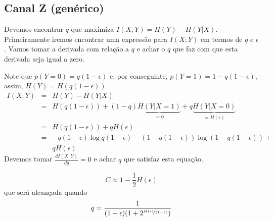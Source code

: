 \subsection{Canal Z (genérico)}

\begin{questions}

\begin{solution}
  Devemos encontrar $q$ que maximiza $I(X;Y) = H(Y) - H(Y|X)$. Primeiramente iremos
  encontrar uma expressão para $I(X;Y)$ em termos de $q$ e $\epsilon$. Vamos tomar
  a derivada com relação a $q$ e achar o $q$ que faz com que esta derivada seja igual a zero.

  Note que $p(Y=0) = q(1-\epsilon)$ e, por conseguinte, $p(Y=1) =1 - q(1-\epsilon)$, assim,
  $H(Y) = H( q(1-\epsilon) )$.
  \begin{align}
  I(X;Y) &=& H(Y) - H(Y|X) \nonumber \\
        &=& H( q(1-\epsilon) ) + (1-q) \underbrace{H(Y|X=1)}_{=0} + q \underbrace{H(Y|X=0)}_{=H(\epsilon)} \nonumber \\
        &=& H( q(1-\epsilon) ) + q H(\epsilon) \nonumber \\
        &=& -q(1-\epsilon) \log q (1-\epsilon) - (1 - q(1-\epsilon)) \log (1 - q(1-\epsilon)) + \nonumber \\
        && q H(\epsilon)
  \end{align}
  Devemos tomar $\frac{d I(X;Y)}{dq} = 0$ e achar $q$ que satisfaz esta equação.

  \begin{equation}
  C \approx 1 - \frac{1}{2} H(\epsilon)
  \end{equation}
  que será alcançada quando
  \begin{equation}
          q = \frac{1}{(1-\epsilon)(1+2^{\nicefrac{H(\epsilon)}{(1-\epsilon)}})}
  \end{equation}


\end{solution}
\end{questions}
